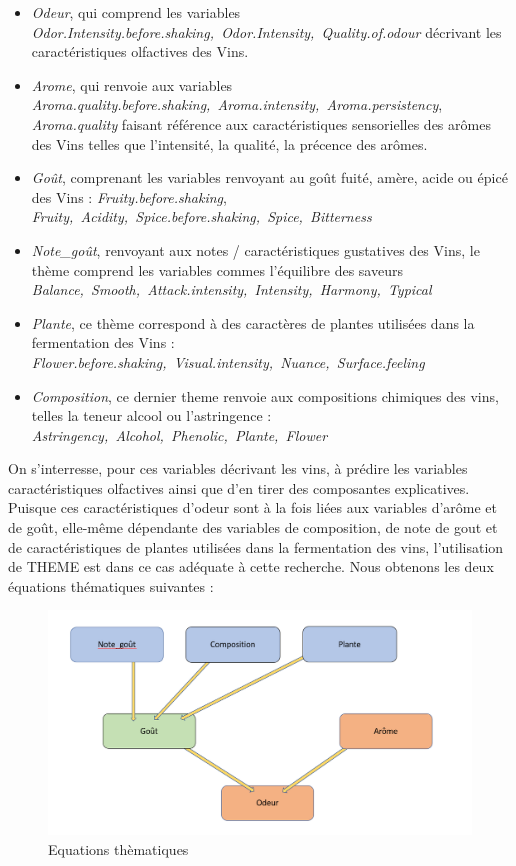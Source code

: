 \documentclass[a4paper,french,10pt]{article}
\begin{document}
\begin{itemize}
	\item \textit{Odeur}, qui comprend les variables \textit{Odor.Intensity.before.shaking,~Odor.Intensity,~Quality.of.odour} décrivant les caractéristiques olfactives des Vins. 
	\item \textit{Arome}, qui renvoie aux variables \textit{Aroma.quality.before.shaking,~Aroma.intensity,~Aroma.persistency}, \textit{Aroma.quality} faisant référence aux caractéristiques sensorielles des arômes des Vins telles que l'intensité, la qualité, la précence des arômes. 
	\item \textit{Goût}, comprenant les variables renvoyant au goût fuité, amère, acide ou épicé des Vins : \textit{Fruity.before.shaking}, \textit{Fruity,~Acidity,~Spice.before.shaking,~Spice,~Bitterness}
	\item \textit{Note\_goût}, renvoyant aux notes / caractéristiques gustatives des Vins, le thème comprend les variables commes l'équilibre des saveurs \textit{Balance,~Smooth,~Attack.intensity,~Intensity,~Harmony,~Typical}
	\item \textit{Plante}, ce thème correspond à des caractères de plantes utilisées dans la fermentation des Vins : \textit{Flower.before.shaking,~Visual.intensity,~Nuance,~Surface.feeling}
	\item \textit{Composition}, ce dernier theme renvoie aux compositions chimiques des vins, telles la teneur alcool ou l'astringence : \textit{Astringency,~Alcohol,~Phenolic,~Plante,~Flower}
\end{itemize} 

\bigskip

On s'interresse, pour ces variables décrivant les vins, à prédire les variables caractéristiques olfactives ainsi que d'en tirer des composantes explicatives. Puisque ces caractéristiques d'odeur sont à la fois liées aux variables d'arôme et de goût, elle-même dépendante des variables de composition, de note de gout et de caractéristiques de plantes utilisées dans la fermentation des vins, l'utilisation de THEME est dans ce cas adéquate à cette recherche. Nous obtenons les deux équations thématiques suivantes : 

\begin{figure}[htp] 
	\centering
	\includegraphics[scale=0.45]{images/Eq_THEME.png}
	\caption{Equations thèmatiques}
\end{figure}
\end{document}
